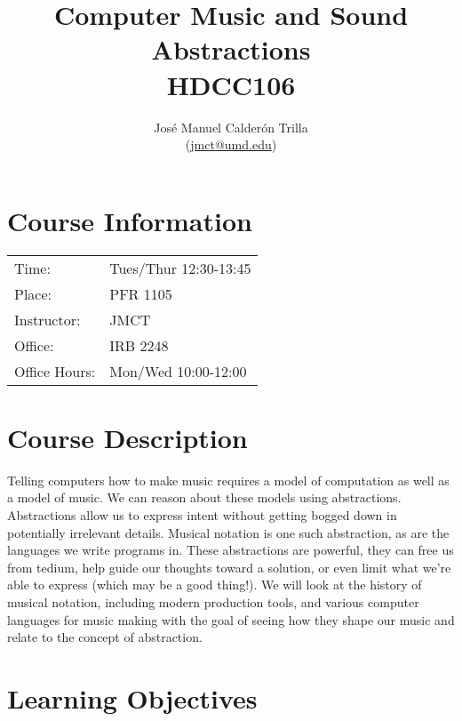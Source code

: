 \documentclass{article}
\begin{document}
\title{Computer Music and Sound Abstractions\\HDCC106}
\author{José Manuel Calderón Trilla \\ (\href{mailto:jmct@umd.edu}{jmct@umd.edu})}
\date{\vspace{-5ex}}

\maketitle

\section{Course Information}

\vspace{24pt}

\begin{center}
\begin{tabular}{l|l}
  \hline
  Time:         & Tues/Thur 12:30-13:45 \\
  Place:        & PFR 1105\\
  Instructor:   & JMCT\\
  Office:       & IRB 2248\\
  Office Hours: & Mon/Wed 10:00-12:00 \\
  \hline
\end{tabular}
\end{center}

\section{Course Description}

Telling computers how to make music requires a model of computation as well as a model of music.
We can reason about these models using abstractions.
Abstractions allow us to express intent without getting bogged down in potentially irrelevant details.
Musical notation is one such abstraction, as are the languages we write programs in.
These abstractions are powerful, they can free us from tedium, help guide our thoughts toward a solution, or even limit what we're able to express (which may be a good thing!).
We will look at the history of musical notation, including modern production tools, and various computer languages for music making with the goal of seeing how they shape our music and relate to the concept of abstraction.

\section{Learning Objectives}
\end{document}
